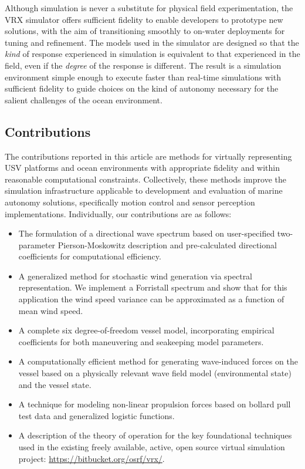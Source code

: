 \documentclass[utf8]{frontiersSCNS} %
\begin{document}
Although simulation is never a substitute for physical field experimentation, the VRX simulator offers sufficient fidelity to enable developers to prototype new solutions, with the aim of transitioning smoothly to on-water deployments for tuning and refinement.  The models used in the simulator are designed so that the \emph{kind} of response experienced in simulation is equivalent to that experienced in the field, even if the \emph{degree} of the response is different.  The result is a simulation environment simple enough to execute faster than real-time simulations with sufficient fidelity to guide choices on the kind of autonomy necessary for the salient challenges of the ocean environment.


\subsection{Contributions}
The contributions reported in this article are methods for virtually representing USV platforms and ocean environments with appropriate fidelity and within reasonable computational constraints. Collectively, these methods improve the simulation infrastructure applicable to development and evaluation of marine autonomy solutions, specifically motion control and sensor perception implementations.  Individually, our contributions are as follows: 
\begin{itemize}
\item The formulation of a directional wave spectrum based on user-specified two-parameter Pierson-Moskowitz description and pre-calculated directional coefficients for computational efficiency.
\item A generalized method for stochastic wind generation via spectral representation. We implement a Forristall spectrum and show that for this application the wind speed variance can be approximated as a function of mean wind speed.
\item A complete six degree-of-freedom vessel model, incorporating empirical coefficients for both maneuvering and seakeeping model parameters.
\item A computationally efficient method for generating wave-induced forces on the vessel based on a physically relevant wave field model (environmental state) and the vessel state.
 \item A technique for modeling non-linear propulsion forces based on bollard pull test data and generalized logistic functions.
\item A description of the theory of operation for the key foundational techniques used in the existing freely available, active, open source virtual simulation project: \url{https://bitbucket.org/osrf/vrx/}.
\end{itemize}
\end{document}
